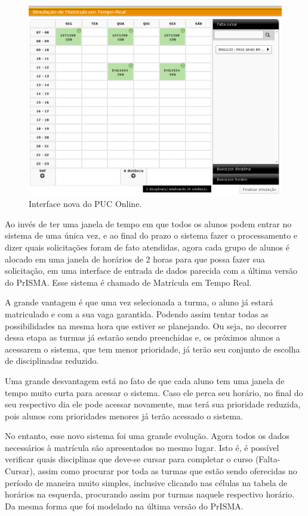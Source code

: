 \documentclass[graduacao,brazil]{ThesisPUC}
\begin{document}
\begin{figure}[H]
    \centering
    \includegraphics[width=\linewidth]{img/puc_online_novo.png}
    \caption{Interface nova do PUC Online.}
\end{figure}

Ao invés de ter uma janela de tempo em que todos os alunos podem entrar no sistema de uma única vez, e ao final do prazo o sistema fazer o processamento e dizer quais solicitações foram de fato atendidas, agora cada grupo de alunos é alocado em uma janela de horários de 2 horas para que possa fazer sua solicitação, em uma interface de entrada de dados parecida com a última versão do PrISMA. Esse sistema é chamado de Matrícula em Tempo Real.

A grande vantagem é que uma vez selecionada a turma, o aluno já estará matriculado e com a sua vaga garantida. Podendo assim tentar todas as possibilidades na mesma hora que estiver se planejando. Ou seja, no decorrer dessa etapa as turmas já estarão sendo preenchidas e, os próximos alunos a acessarem o sistema, que tem menor prioridade, já terão seu conjunto de escolha de disciplinadas reduzido.

Uma grande desvantagem está no fato de que cada aluno tem uma janela de tempo muito curta para acessar o sistema. Caso ele perca seu horário, no final do seu respectivo dia ele pode acessar novamente, mas terá sua prioridade reduzida, pois alunos com prioridades menores já terão acessado o sistema.

No entanto, esse novo sistema foi uma grande evolução. Agora todos os dados necessários à matrícula são apresentados no mesmo lugar. Isto é, é possível verificar quais disciplinas que deve-se cursar para completar o curso (Falta-Cursar), assim como procurar por toda as turmas que estão sendo oferecidas no período de maneira muito simples, inclusive clicando nas células na tabela de horários na esquerda, procurando assim por turmas naquele respectivo horário. Da mesma forma que foi modelado na última versão do PrISMA.
\end{document}
